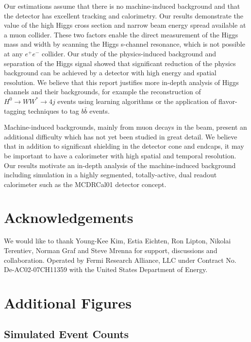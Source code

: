 \documentclass[a4paper]{article}
\begin{document}
Our estimations assume that there is no machine-induced background and that the detector has excellent tracking and calorimetry. Our results demonstrate the value of the high Higgs cross section and narrow beam energy spread available at a muon collider. These two factors enable the direct measurement of the Higgs mass and width by scanning the Higgs s-channel resonance, which is not possible at any $e^+e^-$ collider. Our study of the physics-induced background and separation of the Higgs signal showed that significant reduction of the physics background can be achieved by a detector with high energy and spatial resolution. We believe that this report justifies more in-depth analysis of Higgs channels and their backgrounds, for example the reconstruction of $H^0\rightarrow WW^*\rightarrow 4j$ events using learning algorithms or the application of flavor-tagging techniques to tag $b\bar{b}$ events. 

Machine-induced backgrounds, mainly from muon decays in the beam, present an additional difficulty which has not yet been studied in great detail. We believe that in addition to significant shielding in the detector cone and endcaps, it may be important to have a calorimeter with high spatial and temporal resolution. Our results motivate an in-depth analysis of the machine-induced background including simulation in a highly segmented, totally-active, dual readout calorimeter such as the MCDRCal01 detector concept.

\section{Acknowledgements}
We would like to thank Young-Kee Kim, Estia Eichten, Ron Lipton, Nikolai Terentiev, Norman Graf and Steve Mrenna for support, discussions and collaboration. Operated by Fermi Research Alliance, LLC under Contract No. De-AC02-07CH11359 with the United States Department of Energy. 

\appendix
\section{Additional Figures}
\subsection{Simulated Event Counts}
\label{sec:sim-evt-cts}
\end{document}
